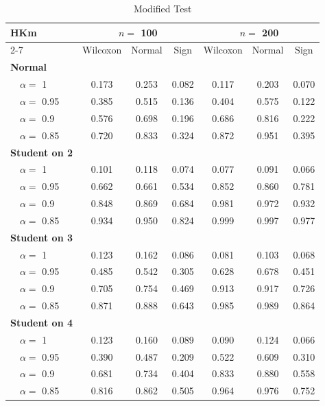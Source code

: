 %
\begin{table}[hptb]
\begin{center}
\begin{tabular}{|l||c|c|c||c|c|c|} \hline
\multicolumn{1}{|l||}{\bf HKm}&\multicolumn{3}{c||}{\bf $n =$ 100}&\multicolumn{3}{c|}{\bf $n =$ 200}\\ \cline{2-7}
\multicolumn{1}{|l||}{}&\multicolumn{1}{c|}{Wilcoxon}&\multicolumn{1}{c|}{Normal}&\multicolumn{1}{c||}{Sign}&\multicolumn{1}{c|}{Wilcoxon}&\multicolumn{1}{c|}{Normal}&\multicolumn{1}{c|}{Sign}\\ \hline
{\bf Normal}&&&&&&\\
~~$\alpha =$ 1&0.173&0.253&0.082&0.117&0.203&0.070\\ 
~~$\alpha =$ 0.95&0.385&0.515&0.136&0.404&0.575&0.122\\ 
~~$\alpha =$ 0.9&0.576&0.698&0.196&0.686&0.816&0.222\\ 
~~$\alpha =$ 0.85&0.720&0.833&0.324&0.872&0.951&0.395\\ \hline
{\bf Student on 2}&&&&&&\\
~~$\alpha =$ 1&0.101&0.118&0.074&0.077&0.091&0.066\\ 
~~$\alpha =$ 0.95&0.662&0.661&0.534&0.852&0.860&0.781\\ 
~~$\alpha =$ 0.9&0.848&0.869&0.684&0.981&0.972&0.932\\ 
~~$\alpha =$ 0.85&0.934&0.950&0.824&0.999&0.997&0.977\\ \hline
{\bf Student on 3}&&&&&&\\
~~$\alpha =$ 1&0.123&0.162&0.086&0.081&0.103&0.068\\ 
~~$\alpha =$ 0.95&0.485&0.542&0.305&0.628&0.678&0.451\\ 
~~$\alpha =$ 0.9&0.705&0.754&0.469&0.913&0.917&0.726\\ 
~~$\alpha =$ 0.85&0.871&0.888&0.643&0.985&0.989&0.864\\ \hline
{\bf Student on 4}&&&&&&\\
~~$\alpha =$ 1&0.123&0.160&0.089&0.090&0.124&0.066\\ 
~~$\alpha =$ 0.95&0.390&0.487&0.209&0.522&0.609&0.310\\ 
~~$\alpha =$ 0.9&0.681&0.734&0.404&0.833&0.880&0.558\\ 
~~$\alpha =$ 0.85&0.816&0.862&0.505&0.964&0.976&0.752\\ 
\hline
\end{tabular}
\vspace{3mm}
\caption{Modified Test\label{HKm}} 
\end{center}
\end{table}
